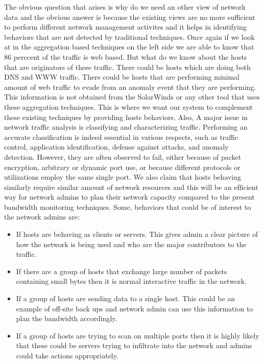 The obvious question that arises is why do we need an other view of network data and the obvious answer is because the existing views are no more sufficient to perform different network management activites and it helps in identifying behaviors that are not detected by traditional techniques. Once again if we look at  in the aggregation based techniques on the left side we are able to know that 86 perccent of the traffic is web based. But what do we know about the hosts that are originators of these traffic. There could be hosts which are doing both DNS and WWW traffic. There could be hosts that are performing minimal amount of web traffic to evade from an anomaly event that they are performing. This information is not obtained from the SolarWinds or any other tool that uses these aggregation techniques. This is where we want our system to complement these existing techniques by providing hosts behaviors. Also, A major issue in network traffic analysis is classifying and characterizing traffic. Performing an accurate classification is indeed essential in various respects, such as traffic control, application identification, defense against attacks, and anomaly detection.
However, they are often observed to fail, either because of packet encryption, arbitrary or dynamic port use, or because different protocols or utilizations employ the same single port.
We also claim that hosts behaving similarly require similar amount of network resources and this will be an efﬁcient way for network admins to plan their network capacity compared to the present bandwidth monitoring techniques. Some, behaviors that could be of interest to the network admins are:


\begin{itemize}
	\item If hosts are behaving as clients or servers. This gives admin a clear picture of how the network is being used and who are the major contributors to the traffic.
	\item If there are a group of hosts that exchange large number of packets containing small bytes then it is normal interactive traffic in the network.	
	\item If a group of hosts are sending data to a single host. This could be an example of off-site back ups and network admin can use this information to plan the bandwidth accordingly.
	\item If a group of hosts are trying to scan on multiple ports then it is highly likely that these could be servers trying to infiltrate into the network and admins could take actions appropriately.
	
\end{itemize}


